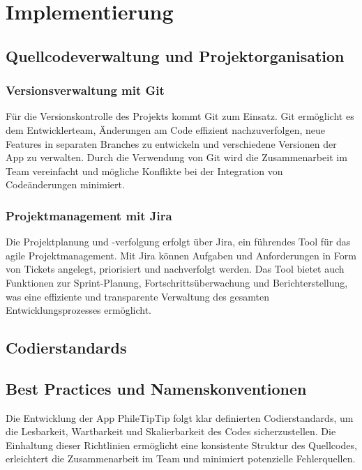 \section{Implementierung}
\subsection{Quellcodeverwaltung und Projektorganisation}

\subsubsection{Versionsverwaltung mit Git}

Für die Versionskontrolle des Projekts kommt Git zum Einsatz. Git ermöglicht es dem Entwicklerteam, Änderungen am Code effizient nachzuverfolgen, neue Features in separaten Branches zu entwickeln und verschiedene Versionen der App zu verwalten. Durch die Verwendung von Git wird die Zusammenarbeit im Team vereinfacht und mögliche Konflikte bei der Integration von Codeänderungen minimiert.

\subsubsection{Projektmanagement mit Jira}

Die Projektplanung und -verfolgung erfolgt über Jira, ein führendes Tool für das agile Projektmanagement. Mit Jira können Aufgaben und Anforderungen in Form von Tickets angelegt, priorisiert und nachverfolgt werden. Das Tool bietet auch Funktionen zur Sprint-Planung, Fortschrittsüberwachung und Berichterstellung, was eine effiziente und transparente Verwaltung des gesamten Entwicklungsprozesses ermöglicht.

\subsection{Codierstandards}
\subsection{Best Practices und Namenskonventionen}

Die Entwicklung der App PhileTipTip folgt klar definierten Codierstandards, um die Lesbarkeit, Wartbarkeit und Skalierbarkeit des Codes sicherzustellen. Die Einhaltung dieser Richtlinien ermöglicht eine konsistente Struktur des Quellcodes, erleichtert die Zusammenarbeit im Team und minimiert potenzielle Fehlerquellen.

